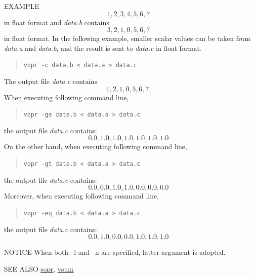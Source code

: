 \begin{qsection}{EXAMPLE}
\begin{displaymath}
  1, 2, 3, 4, 5, 6, 7
\end{displaymath}
in float format and {\em data.b} contains
\begin{displaymath}
  3, 2, 1, 0, 5, 6, 7
\end{displaymath}
in float format.
In the following example,
smaller scalar values can be taken from
{\em data.a} and {\em data.b}, and
the result is sent to {\em data.c} in float format.
\begin{quote}
  \verb!vopr -c data.b < data.a > data.c !
\end{quote}
The output file {\em data.c} contains
\begin{displaymath}
  1, 2, 1, 0, 5, 6, 7.
\end{displaymath}
When executing following command line,
\begin{quote}
  \verb!vopr -ge data.b < data.a > data.c !
\end{quote}
the output file {\em data.c} contains:
\begin{displaymath}
  0.0, 1.0, 1.0, 1.0, 1.0, 1.0, 1.0
\end{displaymath}
On the other hand, when executing following command line,
\begin{quote}
  \verb!vopr -gt data.b < data.a > data.c !
\end{quote}
the output file {\em data.c} contains:
\begin{displaymath}
  0.0, 0.0, 1.0, 1.0, 0.0, 0.0, 0.0
\end{displaymath}
Moreover, when executing following command line,
\begin{quote}
  \verb!vopr -eq data.b < data.a > data.c !
\end{quote}
the output file {\em data.c} contains:
\begin{displaymath}
  0.0, 1.0, 0.0, 0.0, 1.0, 1.0, 1.0
\end{displaymath}
\end{qsection}

\begin{qsection}{NOTICE}
When both --l and --n are specified, latter argument is adopted.
\end{qsection}

\begin{qsection}{SEE ALSO}
\hyperlink{sopr}{sopr},
\hyperlink{vsum}{vsum}
\end{qsection}
